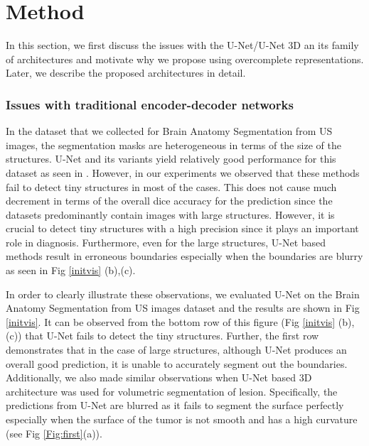 \documentclass[journal,twoside,web]{ieeecolor}
\begin{document}
\section{Method}

In this section,  we first discuss the issues with the U-Net/U-Net 3D an its family of architectures and motivate why we propose using overcomplete representations. Later, we describe the proposed architectures in detail.  










\subsubsection{Issues with traditional encoder-decoder networks}



In the dataset that we collected for Brain Anatomy Segmentation from US images, the segmentation masks are heterogeneous in terms of the size of the structures. 
U-Net and its variants   yield relatively good performance for this dataset as seen in \cite{wang2018automatic, valanarasu2020learning}. However, in our experiments we observed that these methods fail to detect tiny structures in most of the cases.  This does not cause much decrement in terms of the overall dice accuracy for the prediction since the datasets predominantly contain images with large structures. However, it is crucial to detect tiny structures with a high precision since it plays an important role in diagnosis.  Furthermore, even for the large structures, U-Net based methods result in erroneous boundaries especially when the boundaries are blurry as seen in Fig \ref{initvis} (b),(c). 


In order to clearly illustrate these observations, we evaluated U-Net on the  Brain Anatomy Segmentation from US images  dataset and the results are shown in Fig \ref{initvis}. It can be observed from the bottom row of this figure (Fig \ref{initvis} (b),(c)) that U-Net fails to detect the tiny structures. Further, the first row demonstrates that in the case of large structures,  although U-Net produces an overall good prediction, it is unable to accurately segment out the boundaries.  Additionally, we also made similar observations when U-Net based 3D architecture was used for  volumetric segmentation of lesion. Specifically, the predictions from U-Net are blurred as it fails to segment the surface perfectly especially when the surface of the tumor is not smooth and has a high curvature (see  Fig \ref{Fig:first}(a)). 
\end{document}
